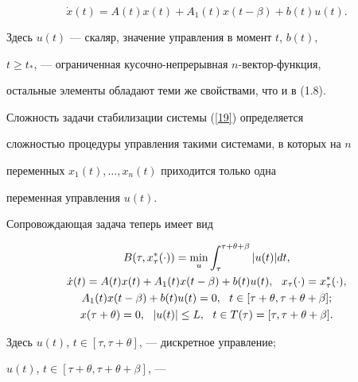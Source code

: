 \begin{equation}\label{19}


\Dot x (t)=A(t)x(t)+A_1(t)x(t-\beta)+b(t)u(t).


\end{equation}


Здесь $u(t)$ --- скаляр, значение управления в момент $t$, $b(t)$,


$t\ge t_*$, --- ограниченная кусочно-непрерывная $n$-вектор-функция,


остальные элементы обладают теми же свойствами, что и в (1.8).





Сложность задачи стабилизации системы (\ref{19}) определяется


сложностью процедуры управления такими системами, в которых на $n$


переменных $x_{1}(t), \dotsc, x_{n}(t)$ приходится только одна


переменная управления $u(t)$.





Сопровождающая задача теперь имеет вид


\begin{gather}


B(\tau,x_{\tau}^*(\cdot))=\min_{u}\int_{\tau}^{\tau+\theta+\beta}


|u(t)|dt, \label{110}\\


%


\Dot x(t)=A(t)x(t)+A_1(t)x(t-\beta)+b(t)u(t),


\ \ x_{\tau}(\cdot)=x_{\tau}^*(\cdot),\notag \\


%


A_1(t)x(t-\beta)+b(t)u(t)=0,


\ \ t \in [\tau+\theta,\tau+\theta+\beta]; \notag \\


%


x(\tau+\theta)=0,\ \


|u(t)| \le L,\ \ t \in T(\tau)=[\tau, \tau+\theta+\beta].\notag


\end{gather}


Здесь $u(t)$, $t \in [\tau, \tau+\theta]$, \tts{[} --- дискретное управление;


$u(t)$, $t \in [\tau+\theta, \tau+\theta+\beta]$, ---


